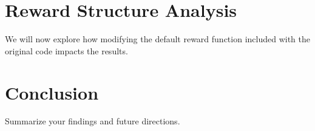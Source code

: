 \documentclass[11pt]{article}
\begin{document}
\section{Reward Structure Analysis}

We will now explore how modifying the default reward function included with the original code impacts the results.



\section{Conclusion}
Summarize your findings and future directions.
\end{document}
